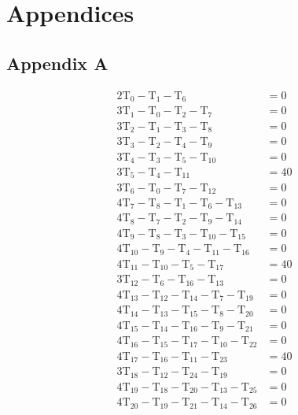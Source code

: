 \documentclass[12pt,a4paper]{article}
\begin{document}
\section{Appendices}
\subsection*{Appendix A}
\begin{align*}
2\text{T}_0-\text{T}_1-\text{T}_6              & =0\\
3\text{T}_1-\text{T}_0-\text{T}_2-\text{T}_7          & =0\\
3\text{T}_2-\text{T}_1-\text{T}_3-\text{T}_8          & =0\\
3\text{T}_3-\text{T}_2-\text{T}_4-\text{T}_9          & =0\\
3\text{T}_4-\text{T}_3-\text{T}_5-\text{T}_{10}       & =0\\
3\text{T}_5-\text{T}_4-\text{T}_{11}           & =40\\
3\text{T}_6-\text{T}_0-\text{T}_7-\text{T}_{12}       & =0\\
4\text{T}_7-\text{T}_8-\text{T}_1-\text{T}_6-\text{T}_{13}   & =0\\
4\text{T}_8-\text{T}_7-\text{T}_2-\text{T}_9-\text{T}_{14}   & =0\\
4\text{T}_9-\text{T}_8-\text{T}_3-\text{T}_{10}-\text{T}_{15}& =0\\
4\text{T}_{10}-\text{T}_9-\text{T}_4-\text{T}_{11}-\text{T}_{16} & =0\\
4\text{T}_{11}-\text{T}_{10}-\text{T}_5-\text{T}_{17} & =40\\
3\text{T}_{12}-\text{T}_6-\text{T}_{16}-\text{T}_{13} & =0\\
4\text{T}_{13}-\text{T}_{12}-\text{T}_{14}-\text{T}_{7}-\text{T}_{19} & =0\\
4\text{T}_{14}-\text{T}_{13}-\text{T}_{15}-\text{T}_{8}-\text{T}_{20} & =0\\
4\text{T}_{15}-\text{T}_{14}-\text{T}_{16}-\text{T}_{9}-\text{T}_{21} & =0\\
4\text{T}_{16}-\text{T}_{15}-\text{T}_{17}-\text{T}_{10}-\text{T}_{22}& =0\\
4\text{T}_{17}-\text{T}_{16}-\text{T}_{11}-\text{T}_{23} & =40\\
3\text{T}_{18}-\text{T}_{12}-\text{T}_{24}-\text{T}_{19} & =0\\
4\text{T}_{19}-\text{T}_{18}-\text{T}_{20}-\text{T}_{13}-\text{T}_{25} & =0\\
4\text{T}_{20}-\text{T}_{19}-\text{T}_{21}-\text{T}_{14}-\text{T}_{26} & =0\\

\end{align*}
\end{document}
